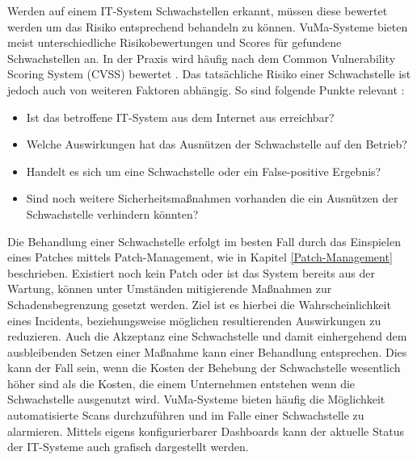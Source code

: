 \bigbreak
Werden auf einem IT-System Schwachstellen erkannt, müssen diese bewertet werden um das Risiko entsprechend behandeln zu können. VuMa-Systeme bieten meist unterschiedliche Risikobewertungen und Scores für gefundene Schwachstellen an. In der Praxis wird häufig nach dem \glqq{}Common Vulnerability Scoring System\grqq{} (CVSS) bewertet \autocite{CVSS}. Das tatsächliche Risiko einer Schwachstelle ist jedoch auch von weiteren Faktoren abhängig. 
\bigbreak
So sind folgende Punkte relevant \autocite{rapid7}:
\begin{itemize}
    \item Ist das betroffene IT-System aus dem Internet aus erreichbar?
    \item Welche Auswirkungen hat das Ausnützen der Schwachstelle auf den Betrieb?
    \item Handelt es sich um eine Schwachstelle oder ein False-positive Ergebnis?
    \item Sind noch weitere Sicherheitsmaßnahmen vorhanden die ein Ausnützen der Schwachstelle verhindern könnten?
\end{itemize}
\bigbreak
Die Behandlung einer Schwachstelle erfolgt im besten Fall durch das Einspielen eines Patches mittels Patch-Management, wie in Kapitel \ref{Patch-Management} beschrieben. Existiert noch kein Patch oder ist das System bereits aus der Wartung, können unter Umständen mitigierende Maßnahmen zur Schadensbegrenzung gesetzt werden. Ziel ist es hierbei die Wahrscheinlichkeit eines Incidents, beziehungsweise möglichen resultierenden Auswirkungen zu reduzieren. Auch die Akzeptanz eine Schwachstelle und damit einhergehend dem ausbleibenden Setzen einer Maßnahme kann einer Behandlung entsprechen. Dies kann der Fall sein, wenn die Kosten der Behebung der Schwachstelle wesentlich höher sind als die Kosten, die einem Unternehmen entstehen wenn die Schwachstelle ausgenutzt wird. \autocite{rapid7}
\bigbreak
VuMa-Systeme bieten häufig die Möglichkeit automatisierte Scans durchzuführen und im Falle einer Schwachstelle zu alarmieren. Mittels eigens konfigurierbarer Dashboards kann der aktuelle Status der IT-Systeme auch grafisch dargestellt werden. 

